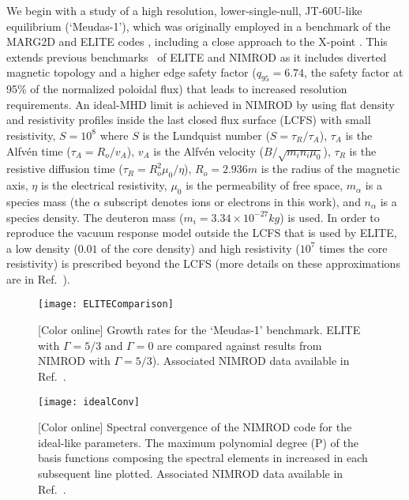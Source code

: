 We begin with a study of a high resolution, lower-single-null, JT-60U-like
equilibrium (`Meudas-1'), which was originally employed in a benchmark of the
MARG2D and ELITE codes \cite{Aiba07}, including a
close approach to the X-point \cite{Snyder09}.
This extends previous benchmarks~\cite{Burke10} of ELITE and NIMROD as it
includes diverted magnetic topology and a higher edge safety factor
($q_{95}=6.74$, the safety factor at 95\% of the normalized poloidal flux) that
leads to increased resolution requirements. An ideal-MHD limit is achieved in
NIMROD by using flat density and resistivity profiles inside the last closed
flux surface (LCFS) with small resistivity, $S=10^8$ where $S$ is the Lundquist
number  ($S=\tau_R/\tau_A$), $\tau_A$ is the Alfvén time ($\tau_A=R_o/v_A$),
$v_A$ is the Alfvén velocity ($B/\sqrt{m_i n_i \mu_0}$), $\tau_R$ is the
resistive diffusion time ($\tau_R=R_o^2 \mu_0/\eta$), $R_o=2.936 m$ is the
radius of the magnetic axis, $\eta$ is the electrical resistivity, $\mu_0$ is
the permeability of free space, $m_\alpha$ is a species mass (the $\alpha$
subscript denotes ions or electrons in this work), and $n_\alpha$ is a species
density. The deuteron mass ($m_i = 3.34\times 10^{-27} kg$) is used. In order to
reproduce the vacuum response model outside the LCFS that is used by ELITE, a
low density ($0.01$ of the core density) and high resistivity ($10^7$ times the
core resistivity) is prescribed beyond the LCFS (more details on these
approximations are in Ref.~\cite{Burke10}).  

\begin{figure}
  \centering
  \texttt{[image: ELITEComparison]}
  \vspace{-4mm}
  \caption{[Color online]
  Growth rates for the `Meudas-1' benchmark. ELITE with $\Gamma=5/3$ and
  $\Gamma=0$ are compared against results from NIMROD with $\Gamma=5/3$).
  Associated NIMROD data available in Ref.~\cite{king16Z}.}
  \label{fig:ELITEComp}
\end{figure}

\begin{figure}
  \centering
  \texttt{[image: idealConv]}
  \vspace{-4mm}
  \caption{[Color online]
  Spectral convergence of the NIMROD code for the ideal-like parameters. 
  The maximum polynomial degree (P) of the basis functions composing the 
  spectral elements in increased in each subsequent line plotted.
  Associated NIMROD data available in Ref.~\cite{king16Z}.}
  \label{idealConv}
\end{figure}

